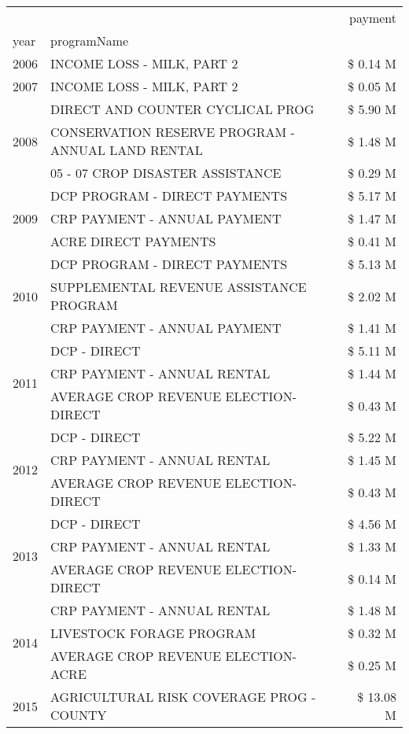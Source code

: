 \begin{tabular}{llr}
\toprule
 &  & payment \\
year & programName &  \\
\midrule
2006 & INCOME LOSS - MILK, PART 2 & \$ 0.14 M \\
\cline{1-3}
2007 & INCOME LOSS - MILK, PART 2 & \$ 0.05 M \\
\cline{1-3}
\multirow[t]{3}{*}{2008} & DIRECT AND COUNTER CYCLICAL PROG & \$ 5.90 M \\
 & CONSERVATION RESERVE PROGRAM - ANNUAL LAND RENTAL & \$ 1.48 M \\
 & 05 - 07 CROP DISASTER ASSISTANCE & \$ 0.29 M \\
\cline{1-3}
\multirow[t]{3}{*}{2009} & DCP PROGRAM - DIRECT PAYMENTS & \$ 5.17 M \\
 & CRP PAYMENT - ANNUAL PAYMENT & \$ 1.47 M \\
 & ACRE DIRECT PAYMENTS & \$ 0.41 M \\
\cline{1-3}
\multirow[t]{3}{*}{2010} & DCP PROGRAM - DIRECT PAYMENTS & \$ 5.13 M \\
 & SUPPLEMENTAL REVENUE ASSISTANCE PROGRAM & \$ 2.02 M \\
 & CRP PAYMENT - ANNUAL PAYMENT & \$ 1.41 M \\
\cline{1-3}
\multirow[t]{3}{*}{2011} & DCP - DIRECT & \$ 5.11 M \\
 & CRP PAYMENT - ANNUAL RENTAL & \$ 1.44 M \\
 & AVERAGE CROP REVENUE ELECTION-DIRECT & \$ 0.43 M \\
\cline{1-3}
\multirow[t]{3}{*}{2012} & DCP - DIRECT & \$ 5.22 M \\
 & CRP PAYMENT - ANNUAL RENTAL & \$ 1.45 M \\
 & AVERAGE CROP REVENUE ELECTION-DIRECT & \$ 0.43 M \\
\cline{1-3}
\multirow[t]{3}{*}{2013} & DCP - DIRECT & \$ 4.56 M \\
 & CRP PAYMENT - ANNUAL RENTAL & \$ 1.33 M \\
 & AVERAGE CROP REVENUE ELECTION-DIRECT & \$ 0.14 M \\
\cline{1-3}
\multirow[t]{3}{*}{2014} & CRP PAYMENT - ANNUAL RENTAL & \$ 1.48 M \\
 & LIVESTOCK FORAGE PROGRAM & \$ 0.32 M \\
 & AVERAGE CROP REVENUE ELECTION-ACRE & \$ 0.25 M \\
\cline{1-3}
\multirow[t]{3}{*}{2015} & AGRICULTURAL RISK COVERAGE PROG - COUNTY & \$ 13.08 M \\

\end{tabular}
